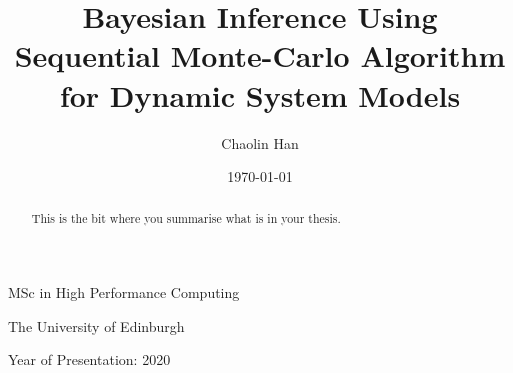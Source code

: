 \documentclass[12pt,a4paper]{report}
\begin{document}

\title{Bayesian Inference Using Sequential Monte-Carlo Algorithm for Dynamic System Models}

\author{Chaolin Han}

\date{\today}

\makeEPCCtitle

\thispagestyle{empty}

\vspace{11cm}

\begin{center}

    \large{MSc in High Performance Computing}

    \large{The University of Edinburgh}

    \large{Year of Presentation: 2020}

\end{center}

\newpage

\begin{abstract}
    This is the bit where you summarise what is in your thesis.
\end{abstract}


\tableofcontents
\listoftables
\listoffigures







\end{document}
